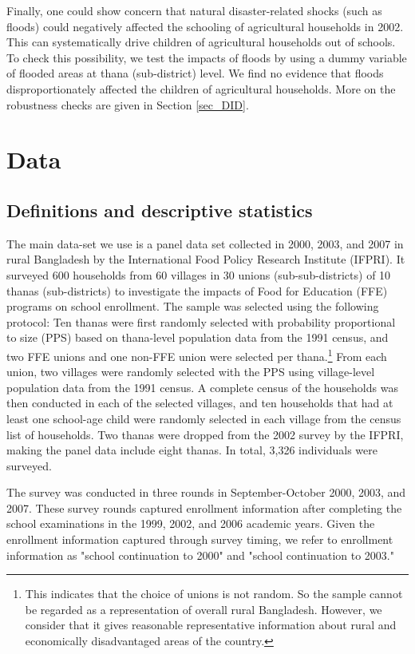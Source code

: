 \documentclass[12pt,letterpaper]{article}
\newcommand{\0}{\ensuremath{\mbox{\boldmath $0$}}}
\begin{document}
Finally, one could show concern that natural disaster-related shocks (such as floods) could negatively affected the schooling of agricultural households in 2002. This can systematically drive children of agricultural households out of schools. To check this possibility, we test the impacts of floods by using a dummy variable of flooded areas at thana (sub-district) level. We find no evidence that floods disproportionately affected the children of agricultural households. More on the robustness checks are given in Section \ref{sec_DID}. 

\section{Data} 
\subsection{Definitions and descriptive statistics}

The main data-set we use is a panel data set collected in 2000, 2003, and 2007 in rural Bangladesh by the International Food Policy Research Institute (IFPRI). It surveyed 600 households from 60 villages in 30 unions (sub-sub-districts) of 10 thanas (sub-districts) to investigate the impacts of Food for Education (FFE) programs on school enrollment. The sample was selected using the following protocol: Ten thanas were first randomly selected with probability proportional to size (PPS) based on thana-level population data from the 1991 census, and two FFE unions and one non-FFE union were selected per thana.\footnote{This indicates that the choice of unions is not random. So the sample cannot be regarded as a representation of overall rural Bangladesh. However, we consider that it gives reasonable representative information about rural and economically disadvantaged areas of the country. } From each union, two villages were randomly selected with the PPS using village-level population data from the 1991 census. A complete census of the households was then conducted in each of the selected villages, and ten households that had at least one school-age child were randomly selected in each village from the census list of households. Two thanas were dropped from the 2002 survey by the IFPRI, making the panel data include eight thanas. In total, 3,326 individuals were surveyed. 

The survey was conducted in three rounds in September-October 2000, 2003, and 2007. These survey rounds captured enrollment information after completing the school examinations in the 1999, 2002, and 2006 academic years. Given the enrollment information captured through survey timing, we refer to enrollment information as "school continuation to 2000" and "school continuation to 2003."
\end{document}
